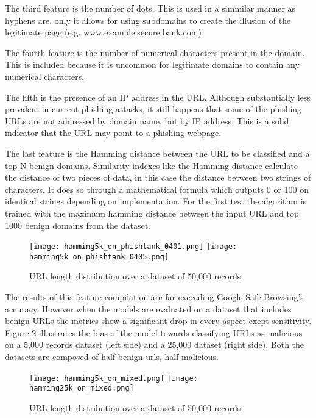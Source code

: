 	The third feature is the number of dots. This is used in a simmilar manner as hyphens are, only it allows for using subdomains to create the illusion of the legitimate page (e.g. www.example.secure.bank.com)

	The fourth feature is the number of numerical characters present in the domain. This is included because it is uncommon for legitimate domains to contain any numerical characters.

	The fifth is the presence of an IP address in the URL. Although substantially less prevalent in current phishing attacks, it still happens that some of the phishing URLs are not addressed by domain name, but by IP address. This is a solid indicator that the URL may point to a phishing webpage.

	The last feature is the Hamming distance between the URL to be classified and a top N benign domains. Similarity indexes like the Hamming distance calculate the distance of two pieces of data, in this case the distance between two strings of characters. It does so through a mathematical formula which outputs 0 or 100 on identical strings depending on implementation. For the first test the algorithm is trained with the maximum hamming distance between the input URL and top 1000 benign domains from the \cite{MAJESTIC_MILLION} dataset.

	\begin{figure}
		\centering
		\texttt{[image: hamming5k\_on\_phishtank\_0401.png]}
		\texttt{[image: hamming5k\_on\_phishtank\_0405.png]}
		\caption{URL length distribution over a dataset of 50,000 records}
		\label{fig:HAMMING_ON_PHISHTANK}
	\end{figure}

	The results of this feature compilation are far exceeding Google Safe-Browsing's accuracy. However when the models are evaluated on a dataset that includes benign URLs the metrics show a significant drop in every aspect exept sensitivity. Figure \ref{fig:HAMMING_ON_MIXED} illustrates the bias of the model towards classifying URLs as malicious on a 5,000 records dataset (left side) and a 25,000 dataset (right side). Both the datasets are composed of half benign urls, half malicious.

	\begin{figure}[b]
		\centering
		\texttt{[image: hamming5k\_on\_mixed.png]}	\texttt{[image: hamming25k\_on\_mixed.png]}
		\caption{URL length distribution over a dataset of 50,000 records}
		\label{fig:HAMMING_ON_MIXED}
	\end{figure}

